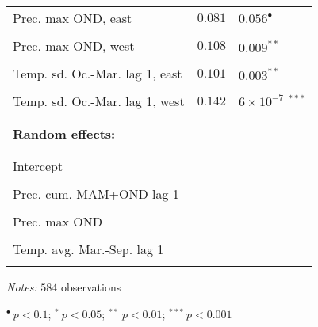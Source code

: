 \documentclass[a4paper,12pt]{article}
\begin{document}
{\begin{threeparttable}
\begin{small}
\begin{tabular}{lrl}
      \vspace{-0.2cm}Prec. max OND, east&$0.081$&$0.056^{\bullet}$\\
  \\
        \vspace{-0.2cm}Prec. max OND, west&$0.108$&$0.009^{**}$\\
  \\
    \vspace{-0.2cm}Temp. sd. Oc.-Mar. lag 1, east&$0.101$&$0.003^{**}$\\
  \\
      \vspace{-0.2cm}Temp. sd. Oc.-Mar. lag 1, west&$0.142$&$6\times10^{-7}$ $^{***}$\\
  \\
  \hline
\vspace{-0.2cm} \\
  \multicolumn{1}{l}{\textbf{Random effects:}}  & \\
\vspace{-0.2cm}
\\
\hline
\\
  \vspace{-0.2cm}Intercept\\
  \\
  \vspace{-0.2cm}Prec. cum. MAM+OND lag 1\\
  \\
  \vspace{-0.2cm}Prec. max OND\\
  \\
    \vspace{-0.2cm}Temp. avg. Mar.-Sep. lag 1\\
  \vspace{-0.1cm} \\ 
  \hline
  
\end{tabular} 
\end{small}
 \begin{tablenotes}
  \begin{footnotesize}
    \item \textit{Notes:} \hspace{0.05cm}$584$ observations
        \begin{adjustwidth}{1cm}{} 
    \item \hspace{0.45cm}$^{\bullet}~p<0.1$; $^{*}~p<0.05$; $^{**}~p<0.01$; $^{***}~p<0.001$
     \end{adjustwidth}
\singlespacing
  \end{footnotesize}
\end{tablenotes}
  \end{threeparttable} 
\par}
\linespread{1}
\end{document}
